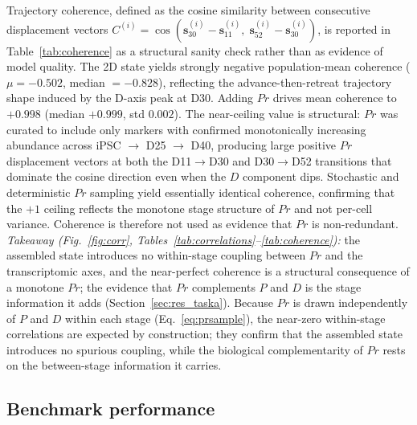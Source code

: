 \documentclass[5p,times,twocolumn]{elsarticle}
\newcommand{\rtag}[1]{}
\newcommand{\rev}[2]{\rtag{#1}#2}
\newcommand{\lang}[1]{#1}
\begin{document}
Trajectory coherence, defined as the cosine similarity between
consecutive displacement vectors
$C^{(i)} = \cos(\mathbf{s}^{(i)}_{30} - \mathbf{s}^{(i)}_{11},\;
\mathbf{s}^{(i)}_{52} - \mathbf{s}^{(i)}_{30})$,
is reported in Table~\ref{tab:coherence} as a structural sanity
check rather than as evidence of model quality.
The 2D state yields strongly negative population-mean coherence
($\mu = -0.502$, median $= -0.828$), reflecting the
advance-then-retreat trajectory shape induced by the D-axis
peak at D30.
Adding $Pr$ drives mean coherence to $+0.998$ (median $+0.999$,
std $0.002$).
The near-ceiling value is structural: $Pr$ was curated to
include only markers with confirmed monotonically increasing
abundance across iPSC $\to$ D25 $\to$ D40, producing large
positive $Pr$ displacement vectors at both the D11$\to$D30 and
D30$\to$D52 transitions that dominate the cosine direction even
when the $D$ component dips.
Stochastic and deterministic $Pr$ sampling yield essentially
identical coherence, confirming \lang{that} the $+1$ ceiling reflects the
monotone stage structure of $Pr$ and not per-cell variance.
\rev{AC}{Coherence is therefore not used as evidence that $Pr$ is
  non-redundant.}
\rev{R1.13}{\textit{Takeaway (Fig.~\ref{fig:corr},
    Tables~\ref{tab:correlations}--\ref{tab:coherence}):} the
  assembled state introduces no within-stage coupling between
  $Pr$ and the transcriptomic axes, and the near-perfect
  coherence is a structural consequence of a monotone $Pr$; the
  evidence that $Pr$ complements $P$ and $D$ is the stage
  information it adds (Section~\ref{sec:res_taska}).}
\rev{AC}{Because $Pr$ is drawn independently of $P$ and $D$
  within each stage (Eq.~\eqref{eq:prsample}), the near-zero
  within-stage correlations are expected by construction; they
  confirm that the assembled state introduces no spurious
  coupling, while the biological complementarity of $Pr$ rests
  on the between-stage information it carries.}

\subsection{\textbf{Benchmark performance}}
\label{sec:res_bench}
\end{document}
